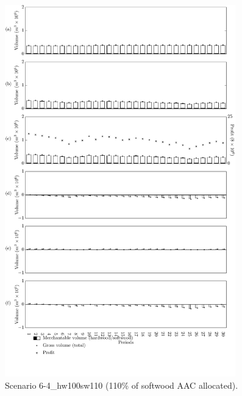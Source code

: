 \begin{figure}[h]
  \centering
  \includegraphics[width=10cm]{images/appendix/s6-4_hw100sw110}
  \caption{Scenario 6-4\_hw100sw110 (110\% of softwood AAC allocated).}
  \label{fig:s6-4_hw100sw110}
\end{figure}

